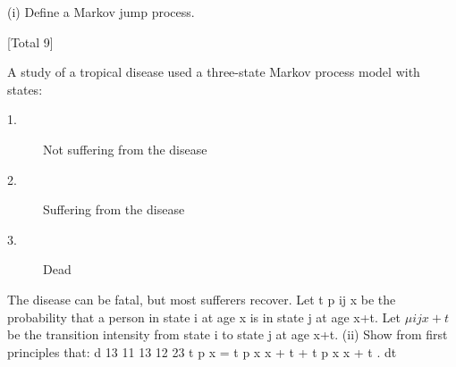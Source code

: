 \documentclass[a4paper,12pt]{article}
\begin{document}
\begin{enumerate}
\newpage
(i) Define a Markov jump process.

[Total 9]

A study of a tropical disease used a three-state Markov process model with states:
\begin{description}
\item[1.] Not suffering from the disease
\item[2.] Suffering from the disease
\item[3.] Dead
\end{description}
The disease can be fatal, but most sufferers recover. Let t p ij x be the probability that a
person in state i at age x is in state j at age x+t. Let $\mu ijx + t$ be the transition intensity
from state i to state j at age x+t.
(ii)
Show from first principles that:
d 13
11 13
12 23
t p x = t p x \mu x + t + t p x \mu x + t .
dt


\end{enumerate}
\end{document}
